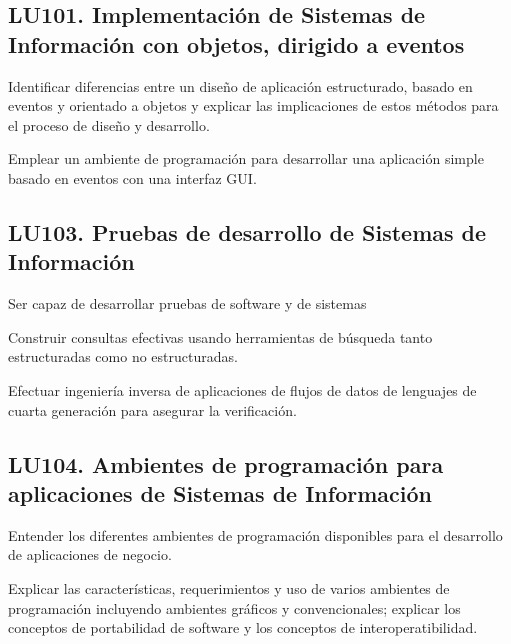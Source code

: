 \subsection{LU101. Implementación de Sistemas de Información con objetos, dirigido a eventos}\label{sec:BOK-LU101}\label{sec:LU101}
\begin{LearningUnit}
\begin{LUGoal}
\item Identificar diferencias entre un diseño de aplicación estructurado, basado en eventos y orientado a objetos y explicar las implicaciones de estos métodos para el proceso de diseño y desarrollo.
\end{LUGoal}

\begin{LUObjective}
\item Emplear un ambiente de programación para desarrollar una aplicación simple basado en eventos con una interfaz GUI.
\end{LUObjective}
\end{LearningUnit}

\subsection{LU103. Pruebas de desarrollo de Sistemas de Información}\label{sec:BOK-LU103}\label{sec:LU103}
\begin{LearningUnit}
\begin{LUGoal}
\item Ser capaz de desarrollar pruebas de software y de sistemas
\end{LUGoal}

\begin{LUObjective}
\item Construir consultas efectivas usando herramientas de búsqueda tanto estructuradas como no estructuradas.
\item Efectuar ingeniería inversa de aplicaciones de flujos de datos de lenguajes de cuarta generación para asegurar la verificación.
\end{LUObjective}
\end{LearningUnit}

\subsection{LU104. Ambientes de programación para aplicaciones de Sistemas de Información}\label{sec:BOK-LU104}\label{sec:LU104}
\begin{LearningUnit}
\begin{LUGoal}
\item Entender los diferentes ambientes de programación disponibles para el desarrollo de aplicaciones de negocio.
\end{LUGoal}

\begin{LUObjective}
\item Explicar las características, requerimientos y uso de varios ambientes de programación incluyendo ambientes gráficos y convencionales; explicar los conceptos de portabilidad de software y los conceptos de interoperatibilidad.
\end{LUObjective}
\end{LearningUnit}

